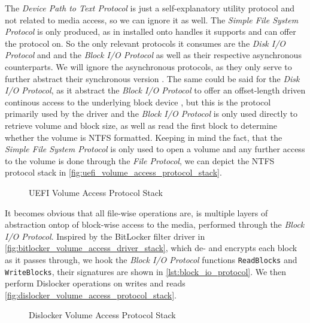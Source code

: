 The \emph{Device Path to Text Protocol} is just a self-explanatory utility protocol and not related to media access, so we can ignore it as well. The \emph{Simple File System Protocol} is only produced, as in installed onto handles it supports and can offer the protocol on. So the only relevant protocols it consumes are the \emph{Disk I/O Protocol} and and the \emph{Block I/O Protocol} as well as their respective asynchronous counterparts. We will ignore the asynchronous protocols, as they only serve to further abstract their synchronous version \cite[13.8 and 13.10]{uefi-spec}. The same could be said for the \emph{Disk I/O Protocol}, as it abstract the \emph{Block I/O Protocol} to offer an offset-length driven continous access to the underlying block device \cite[13.7]{uefi-spec}, but this is the protocol primarily used by the driver and the \emph{Block I/O Protocol} is only used directly to retrieve volume and block size, as well as read the first block to determine whether the volume is \ac{NTFS} formatted. Keeping in mind the fact, that the \emph{Simple File System Protocol} is only used to open a volume and any further access to the volume is done through the \emph{File Protocol}, we can depict the \ac{NTFS} protocol stack in \autoref{fig:uefi_volume_access_protocol_stack}.

\begin{figure}[htb]%
    \centering
    
    \caption{\ac{UEFI} Volume Access Protocol Stack}%
    \label{fig:uefi_volume_access_protocol_stack}%
\end{figure}

It becomes obvious that all file-wise operations are, is multiple layers of abstraction ontop of block-wise access to the media, performed through the \emph{Block I/O Protocol}. Inspired by the BitLocker filter driver in \autoref{fig:bitlocker_volume_access_driver_stack}, which de- and encrypts each block as it passes through, we hook the \emph{Block I/O Protocol} functions \lstinline{ReadBlocks} and \lstinline{WriteBlocks}, their signatures are shown in \autoref{lst:block_io_protocol}. We then perform Dislocker operations on writes and reads \autoref{fig:dislocker_volume_access_protocol_stack}.



\begin{figure}[htb]%
    \centering
    
    \caption{Dislocker Volume Access Protocol Stack}%
    \label{fig:dislocker_volume_access_protocol_stack}%
\end{figure}

